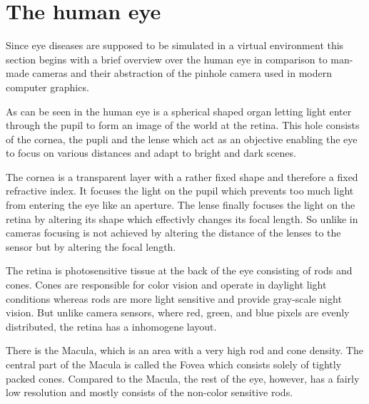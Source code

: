 \documentclass{acm_proc_article-sp}
\begin{document}
\section{The human eye}
Since eye diseases are supposed to be simulated in a virtual environment this section begins with a brief overview over the human eye in comparison to man-made cameras and their abstraction of the pinhole camera used in modern computer graphics.

As can be seen in  the human eye is a spherical shaped organ letting light enter through the pupil to form an image of the world at the retina.
This hole consists of the cornea, the pupli and the lense which act as an objective enabling the eye to focus on various distances and adapt to bright and dark scenes.

The cornea is a transparent layer with a rather fixed shape and therefore a fixed refractive index.
It focuses the light on the pupil which prevents too much light from entering the eye like an aperture.
The lense finally focuses the light on the retina by altering its shape which effectivly changes its focal length.
So unlike in cameras focusing is not achieved by altering the distance of the lenses to the sensor but by altering the focal length.

The retina is photosensitive tissue at the back of the eye consisting of rods and cones.
Cones are responsible for color vision and operate in daylight light conditions whereas rods are more light sensitive and provide gray-scale night vision.
But unlike camera sensors, where red, green, and blue pixels are evenly distributed, the retina has a inhomogene layout.

There is the Macula, which is an area with a very high rod and cone density.
The central part of the Macula is called the Fovea which consists solely of tightly packed cones.
Compared to the Macula, the rest of the eye, however, has a fairly low resolution and mostly consists of the non-color sensitive rods.
\end{document}
